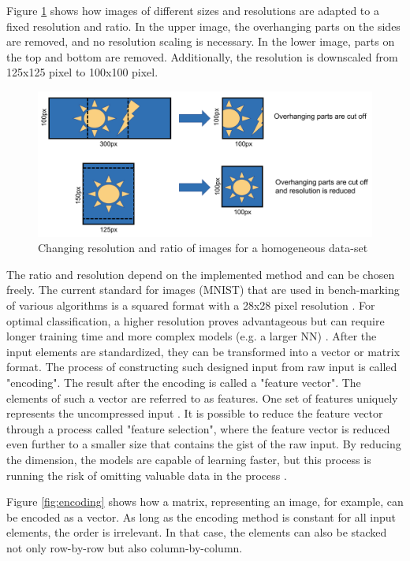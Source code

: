 Figure \ref{fig:pixel} shows how images of different sizes and resolutions are adapted to a fixed resolution and ratio. In the upper image, the overhanging parts on the sides are removed, and no resolution scaling is necessary. In the lower image, parts on the top and bottom are removed. Additionally, the resolution is downscaled from 125x125 pixel to 100x100 pixel. 

\begin{figure}[H]
	\centering
	\includegraphics[width=1\linewidth]{IMGs/pixel.png}
	\caption{Changing resolution and ratio of images for a homogeneous data-set}
	\label{fig:pixel}
\end{figure}
\newpage
The ratio and resolution depend on the implemented method and can be chosen freely. 
The current standard for images (MNIST) that are used in bench-marking of various algorithms is a squared format with a 28x28 pixel resolution \cite{Baldominos}. For optimal classification, a higher resolution proves advantageous but can require longer training time and more complex models (e.g. a larger NN) \cite{Kannojia,Huang}. After the input elements are standardized, they can be transformed into a vector or matrix format. The process of constructing such designed input from raw input is called "encoding". The result after the encoding is called a "feature vector". The elements of such a vector are referred to as features. One set of features uniquely represents the uncompressed input \cite{Theodoridis}. It is possible to reduce the feature vector through a process called "feature selection", where the feature vector is reduced even further to a smaller size that contains the gist of the raw input. By reducing the dimension, the models are capable of learning faster, but this process is running the risk of omitting valuable data in the process \cite{Janiesch}.

Figure \ref{fig:encoding} shows how a matrix, representing an image, for example, can be encoded as a vector. As long as the encoding method is constant for all input elements, the order is irrelevant. In that case, the elements can also be stacked not only row-by-row but also column-by-column.

